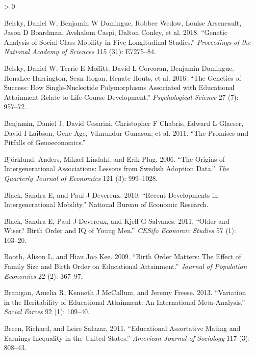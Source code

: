 \documentclass[
]{article}
\newlength{\cslhangindent}
\newenvironment{CSLReferences}[2] %
 {%
  \setlength{\parindent}{0pt}
  \ifodd #1 \everypar{\setlength{\hangindent}{\cslhangindent}}\ignorespaces\fi
  \ifnum #2 > 0
  \setlength{\parskip}{#2\baselineskip}
  \fi
 }%
 {}
\begin{document}
\begin{CSLReferences}{1}{0}
\leavevmode\hypertarget{ref-belsky2018genetic}{}%
Belsky, Daniel W, Benjamin W Domingue, Robbee Wedow, Louise Arseneault, Jason D Boardman, Avshalom Caspi, Dalton Conley, et al. 2018. {``Genetic Analysis of Social-Class Mobility in Five Longitudinal Studies.''} \emph{Proceedings of the National Academy of Sciences} 115 (31): E7275--84.

\leavevmode\hypertarget{ref-belsky2016genetics}{}%
Belsky, Daniel W, Terrie E Moffitt, David L Corcoran, Benjamin Domingue, HonaLee Harrington, Sean Hogan, Renate Houts, et al. 2016. {``The Genetics of Success: How Single-Nucleotide Polymorphisms Associated with Educational Attainment Relate to Life-Course Development.''} \emph{Psychological Science} 27 (7): 957--72.

\leavevmode\hypertarget{ref-benjamin2011promises}{}%
Benjamin, Daniel J, David Cesarini, Christopher F Chabris, Edward L Glaeser, David I Laibson, Gene Age, Vilmundur Gunason, et al. 2011. {``The Promises and Pitfalls of Genoeconomics.''}

\leavevmode\hypertarget{ref-bjorklund2006origins}{}%
Björklund, Anders, Mikael Lindahl, and Erik Plug. 2006. {``The Origins of Intergenerational Associations: Lessons from Swedish Adoption Data.''} \emph{The Quarterly Journal of Economics} 121 (3): 999--1028.

\leavevmode\hypertarget{ref-black2010recent}{}%
Black, Sandra E, and Paul J Devereux. 2010. {``Recent Developments in Intergenerational Mobility.''} National Bureau of Economic Research.

\leavevmode\hypertarget{ref-black2011older}{}%
Black, Sandra E, Paul J Devereux, and Kjell G Salvanes. 2011. {``Older and Wiser? Birth Order and IQ of Young Men.''} \emph{CESifo Economic Studies} 57 (1): 103--20.

\leavevmode\hypertarget{ref-booth2009birth}{}%
Booth, Alison L, and Hiau Joo Kee. 2009. {``Birth Order Matters: The Effect of Family Size and Birth Order on Educational Attainment.''} \emph{Journal of Population Economics} 22 (2): 367--97.

\leavevmode\hypertarget{ref-branigan2013variation}{}%
Branigan, Amelia R, Kenneth J McCallum, and Jeremy Freese. 2013. {``Variation in the Heritability of Educational Attainment: An International Meta-Analysis.''} \emph{Social Forces} 92 (1): 109--40.

\leavevmode\hypertarget{ref-breen2011educational}{}%
Breen, Richard, and Leire Salazar. 2011. {``Educational Assortative Mating and Earnings Inequality in the United States.''} \emph{American Journal of Sociology} 117 (3): 808--43.


\end{CSLReferences}
\end{document}
